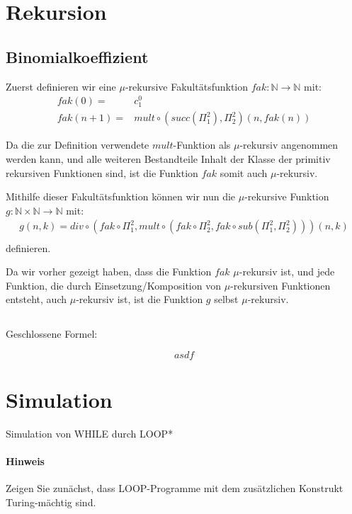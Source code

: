 \documentclass[10pt,leqno ]{article}
\begin{document}
\section{Rekursion}
\subsection{Binomialkoeffizient}
Zuerst definieren wir eine $\mu$-rekursive Fakultätsfunktion $fak: \mathbb{N} \rightarrow \mathbb{N}$ mit:
\begin{align*}
    fak(0) =& c^0_1 \\
    fak(n+1) =& mult \circ (succ(\Pi^2_1), \Pi^2_2)(n, fak(n))
\end{align*}

Da die zur Definition verwendete $mult$-Funktion als $\mu$-rekursiv angenommen werden kann, und alle weiteren Bestandteile Inhalt der Klasse der primitiv rekursiven Funktionen sind, ist die Funktion $fak$ somit auch $\mu$-rekursiv.

Mithilfe dieser Fakultätsfunktion können wir nun die $\mu$-rekursive Funktion $g: \mathbb{N} \times \mathbb{N} \rightarrow \mathbb{N}$ mit: 
\begin{align*}
    g(n,k) = div \circ (fak \circ \Pi^2_1, mult \circ (fak \circ \Pi^2_2, fak \circ sub(\Pi^2_1, \Pi^2_2))) (n,k) \\
\end{align*}
definieren.

Da wir vorher gezeigt haben, dass die Funktion $fak$ $\mu$-rekursiv ist, und jede Funktion, die durch Einsetzung/Komposition von $\mu$-rekursiven Funktionen entsteht, auch $\mu$-rekursiv ist, ist die Funktion $g$ selbst $\mu$-rekursiv.


\subsection{}
Geschlossene Formel: 

\begin{equation}
asdf
\end{equation}

\pagebreak

\section{Simulation}

Simulation von WHILE durch LOOP*

\paragraph{Hinweis}
Zeigen Sie zunächst, dass LOOP-Programme mit dem zusätzlichen Konstrukt
Turing-mächtig sind.
    
\end{document}
